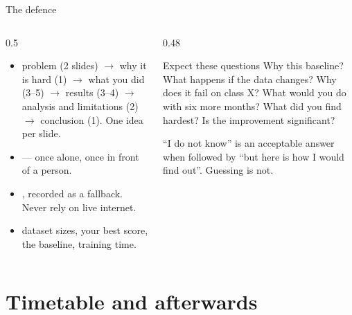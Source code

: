 \documentclass[aspectratio=169,11pt]{beamer}
\begin{document}
\begin{frame}{The defence}
\begin{columns}[T]
\begin{column}{0.5\textwidth}
\footnotesize
\begin{itemize}
  \item {} problem (2 slides) $\rightarrow$ why it is hard (1)
        $\rightarrow$ what you did (3--5) $\rightarrow$ results (3--4)
        $\rightarrow$ analysis and limitations (2) $\rightarrow$ conclusion
        (1). One idea per slide.
  \item {} --- once alone, once in front of
        a person.
  \item {}, recorded as a fallback. Never rely on live
        internet.
  \item {} dataset sizes, your best score, the baseline,
        training time.
\end{itemize}
\end{column}
\begin{column}{0.48\textwidth}
\begin{block}{Expect these questions}
\footnotesize
Why this baseline? What happens if the data changes? Why does it fail on class
X? What would you do with six more months? What did you find hardest? Is the
improvement significant?
\end{block}
\begin{alertblock}{}
\footnotesize
``I do not know'' is an acceptable answer when followed by ``but here is how I
would find out''. Guessing is not.
\end{alertblock}
\end{column}
\end{columns}
\end{frame}

\section{Timetable and afterwards}
\end{document}
